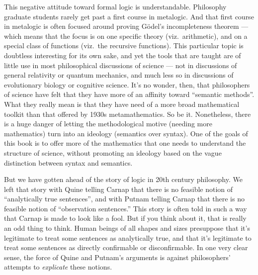 This negative attitude toward formal logic is understandable.
Philosophy graduate students rarely get past a first course in
metalogic.  And that first course in metalogic is often focused around
proving G\"odel's incompleteness theorem --- which means that the
focus is on one specific theory (viz.\ arithmetic), and on a special
class of functions (viz.\ the recursive functions).  This particular
topic is doubtless interesting for its own sake, and yet the tools
that are taught are of little use in most philosophical discussions of
science --- not in discussions of general relativity or quantum
mechanics, and much less so in discussions of evolutionary biology or
cognitive science.  It's no wonder, then, that philosophers of science
have felt that they have more of an affinity toward ``semantic
methods''.  What they really mean is that they have need of a more
broad mathematical toolkit than that offered by 1930s metamathematics.
So be it.  Nonetheless, there is a huge danger of letting the
methodological motive (needing more mathematics) turn into an ideology
(semantics over syntax).  One of the goals of this book is to offer
more of the mathematics that one needs to understand the structure of
science, without promoting an ideology based on the vague distinction
between syntax and semantics.

But we have gotten ahead of the story of logic in 20th century
philosophy.  We left that story with Quine telling Carnap that there
is no feasible notion of ``analytically true sentences'', and with
Putnam telling Carnap that there is no feasible notion of
``observation sentences.''  This story is often told in such a way
that Carnap is made to look like a fool.  But if you think about it,
that is really an odd thing to think.  Human beings of all shapes and
sizes presuppose that it's legitimate to treat some sentences as
analytically true, and that it's legitimate to treat some sentences as
directly confirmable or disconfirmable.  In one very clear sense, the
force of Quine and Putnam's arguments is against philosophers'
attempts to {\it explicate} these notions.

